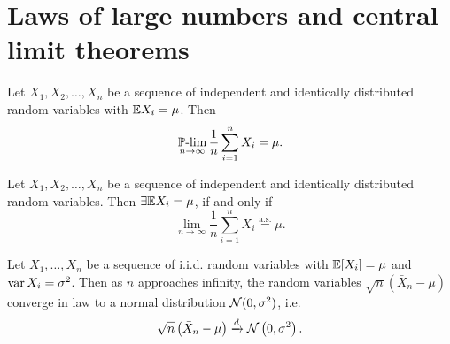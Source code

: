     \section{Laws of large numbers and central limit theorems}
        \begin{theorem}[Khinchin]
            Let $X_1, X_2, \dots, X_n$ be a sequence of independent and identically distributed random variables with $\mathbb{E} X_i = \mu$. Then
            \begin{equation}
                \operatorname*{\operatorname{\mathbb{P}-lim}}_{n \to \infty} \frac{1}{n} \sum_{i=1}^n X_i = \mu.
            \end{equation}
        \end{theorem}
        \begin{theorem}[Kolmogorov]
            Let $X_1, X_2, \dots, X_n$ be a sequence of independent and identically distributed random variables. Then $\exists \mathbb{E} X_i = \mu$, if and only if
            \begin{equation}
                \lim_{n \to \infty} \frac{1}{n} \sum_{i=1}^n X_i \overset{\text{a.s.}}{=} \mu.
            \end{equation}
        \end{theorem}

        \begin{theorem}
            Let $X_1, \dots, X_n$ be a sequence of i.i.d. random variables with $\E[X_i] \hm{=} \mu$ and $\operatorname*{var} X_i = \sigma^2$. 
            Then as $n$ approaches infinity, the random variables $\sqrt{n}(\bar{X}_n - \mu)$ converge in law to a normal distribution ${\cal N}(0, \sigma^2)$, i.e.
            \begin{equation}
                \sqrt{n}\left(\bar{X}_n - \mu\right) \xrightarrow{d} {\cal N}\left(0,\sigma^2\right).
            \end{equation}
        \end{theorem}


